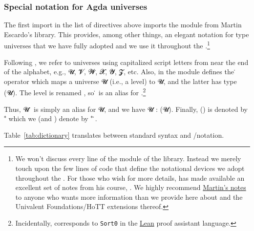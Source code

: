 \subsubsection{Special notation for Agda universes}
\label{special-notation-for-agda-universes}
The first import in the list of \AgdaSpace{} directives above imports the \universes module from Martin Escardo's \TypeTopology library. This provides, among other things, an elegant notation for type universes that we have fully adopted and we use it throughout the \agdaualib.\footnote{We won't discuss every line of the \universes module of the \typetopology library. Instead we merely touch upon the few lines of code that define the notational devices we adopt throughout the \ualib. For those who wish for more details, \mhe has made available an excellent set of notes from his course, \MGSnineteen. We highly recommend \href{https://www.cs.bham.ac.uk/~mhe/HoTT-UF-in-Agda-Lecture-Notes/index.html}{Martin's notes} to anyone who wants more information than we provide here about \MLTT and the Univalent Foundations/HoTT extensions thereof.}

Following \mhe, we refer to universes using capitalized script letters from near the end of the alphabet, e.g., \ab 𝓤, \ab 𝓥, \ab 𝓦, \ab 𝓧, \ab 𝓨, \ab 𝓩, etc. Also, in the \universes module \mhe defines the \af ̇ operator which maps a universe \ab 𝓤 (i.e., a level) to \Set \ab 𝓤, and the latter has type \Set(\lsuc \ab 𝓤). The level \lzero is renamed , so \af ̇ is an alias for \Set \lzero.\footnote{Incidentally, \Set \lzero corresponds to \texttt{Sort0} in the \href{https://leanprover.github.io/}{Lean} proof assistant language.}

Thus, \ab 𝓤 ̇ is simply an alias for \Set \ab 𝓤, and we have \Set \ab 𝓤 : \Set (\lsuc \ab 𝓤). Finally, \Set(\lsuc \lzero) is denoted by \Set {} ⁺ which we (and \mhe) denote by  ⁺ ̇.

Table~\ref{tab:dictionary} translates between standard \agda syntax and \mhe/\ualib notation.

